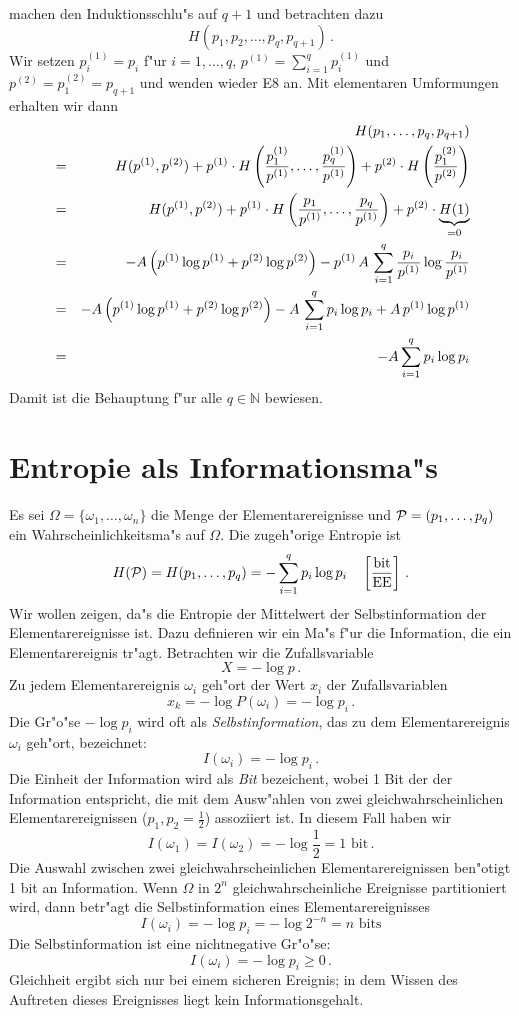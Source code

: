 \documentclass[10pt]{article}
\begin{document}
machen den Induktionsschlu"s auf $q+1$ und betrachten dazu
$$ H(p_1,p_2,\ldots,p_q,p_{q+1}) \, . $$
Wir setzen $p_i^{(1)}=p_i$ f"ur $i=1,\ldots,q$, 
$p^{(1)}=\sum_{i=1}^q p_i^{(1)}$ und $p^{(2)}=p_1^{(2)}=p_{q+1}$ und wenden
wieder E8 an. Mit elementaren Umformungen erhalten wir dann
\begin{eqnarray*}
  & &
  H(p_1,\ldots,p_q,p_{q+1}) \\
  & = & 
  H(p^{(1)},p^{(2)}) +
  p^{(1)} \cdot
  H\left({p_1^{(1)}\over p^{(1)}},\ldots,{p_q^{(1)}\over p^{(1)}}\right) +
  p^{(2)} \cdot 
  H\left({p_1^{(2)}\over p^{(2)}}\right) \\
  & = &
  H(p^{(1)},p^{(2)}) +
  p^{(1)} \cdot
  H\left({p_1\over p^{(1)}},\ldots,{p_q\over p^{(1)}}\right) +
  p^{(2)} \cdot 
  \underbrace{H(1)}_{=0} \\
  & = &
  -A \left( p^{(1)}\log p^{(1)} + p^{(2)}\log p^{(2)} \right) -
  p^{(1)}\, A\,\sum_{i=1}^q {p_i\over p^{(1)}} \log {p_i\over p^{(1)}} \\
  & = &
  -A \left( p^{(1)}\log p^{(1)} + p^{(2)}\log p^{(2)} \right) -
  A\,\sum_{i=1}^q p_i \log p_i + A \, p^{(1)} \log p^{(1)} \\
  & = &
  -A \sum_{i=1}^q p_i \log p_i
\end{eqnarray*}
Damit ist die Behauptung f"ur alle $q\in\mathbb{N}$ bewiesen.


\section{Entropie als Informationsma"s}
Es sei $\Omega=\{\omega_1,\ldots,\omega_n\} $ die Menge der Elementarereignisse
und ${\cal P}=(p_1,\ldots,p_q)$ ein Wahrscheinlichkeitsma"s auf $\Omega$.
Die zugeh"orige Entropie ist
$$ H({\cal P}) = H(p_1,\ldots,p_q) = -\sum_{i=1}^q p_i \log p_i \quad
   \left[ {\mbox{bit}\over\mbox{EE}}\right]\,. $$
Wir wollen zeigen, da"s die Entropie der Mittelwert 
der Selbstinformation der Elementarereignisse ist. Dazu
definieren wir ein Ma"s f"ur die Information, die ein
Elementarereignis tr"agt. Betrachten wir die Zufallsvariable 
$$ X=-\log p\,. $$
Zu jedem Elementarereignis $\omega_i$ geh"ort der Wert $x_i$ der
Zufallsvariablen
$$ x_k = -\log P(\omega_i) = -\log p_i\,. $$
Die Gr"o"se $-\log p_i$ wird oft als \emph{Selbstinformation}, das zu dem
Elementarereignis $\omega_i$ geh"ort, bezeichnet:
$$ I(\omega_i)=-\log p_i\,.$$
Die Einheit der Information wird als \emph{Bit} bezeichent, wobei 1 Bit der
der Information entspricht, die mit dem  Ausw"ahlen von zwei 
gleichwahrscheinlichen Elementarereignissen ($p_1,p_2=\frac{1}{2}$) 
assoziiert ist. In diesem Fall haben wir
$$ I(\omega_1)=I(\omega_2)=-\log \frac{1}{2} = 1 \mbox{ bit}\,. $$
Die Auswahl zwischen zwei gleichwahrscheinlichen Elementarereignissen 
ben"otigt 1 bit an Information. Wenn $\Omega$ in $2^n$ gleichwahrscheinliche
Ereignisse partitioniert wird, dann betr"agt die Selbstinformation eines
Elementarereignisses
$$ I(\omega_i) = -\log p_i = -\log 2^{-n} = n \mbox{ bits} $$
Die Selbstinformation ist eine nichtnegative Gr"o"se:
$$ I(\omega_i) = -\log p_i \ge 0\,. $$
Gleichheit ergibt sich nur bei einem sicheren Ereignis; in dem Wissen des
Auftreten dieses Ereignisses liegt kein Informationsgehalt.
\end{document}

